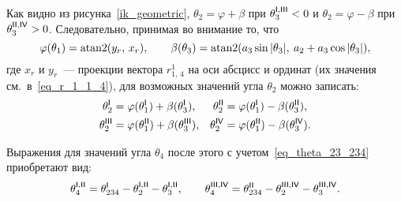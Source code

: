 Как видно из рисунка~\ref{ik_geometric}, $\theta_2 = \varphi + \beta$ при $\theta_3^{\mathsf{I,III}} < 0$ и $\theta_2 = \varphi - \beta$ при $\theta_3^{\mathsf{II,IV}} > 0$.
Следовательно, принимая во внимание то, что
\begin{equation}
    \varphi(\theta_1) = \atan2(y_r,\, x_r),
    \qquad
    \beta(\theta_3) = \atan2(a_3\sin|\theta_3|,\: a_2 + a_3\cos|\theta_3|),
\end{equation}
где $x_r$ и $y_r$~--- проекции вектора $r^1_{1,\,4}$ на оси абсцисс и ординат (их значения см.~в~\eqref{eq_r_1_1_4}), для возможных значений угла $\theta_2$ можно записать:
\begin{align}
	\theta_2^{\mathsf{I}} &= \varphi(\theta_1^{\mathsf{I}}) + \beta(\theta_3^{\mathsf{I}}), &
	\theta_2^{\mathsf{II}} &= \varphi(\theta_1^{\mathsf{I}}) - \beta(\theta_3^{\mathsf{II}}),\\
	\theta_2^{\mathsf{III}} &= \varphi(\theta_1^{\mathsf{II}}) + \beta(\theta_3^{\mathsf{III}}), &
	\theta_2^{\mathsf{IV}} &= \varphi(\theta_1^{\mathsf{II}}) - \beta(\theta_3^{\mathsf{IV}})\ldotp
\end{align}

Выражения для значений угла $\theta_4$ после этого с учетом~\eqref{eq_theta_23_234} приобретают вид:
\begin{equation}
	\theta_4^{\mathsf{I,II}} = \theta_{234}^{\mathsf{I}} - \theta_{2}^{\mathsf{I,II}} - \theta_{3}^{\mathsf{I,II}},
	\qquad
	\theta_4^{\mathsf{III,IV}} = \theta_{234}^{\mathsf{II}} - \theta_{2}^{\mathsf{III, IV}} - \theta_{3}^{\mathsf{III,IV}}\ldotp
\end{equation}

